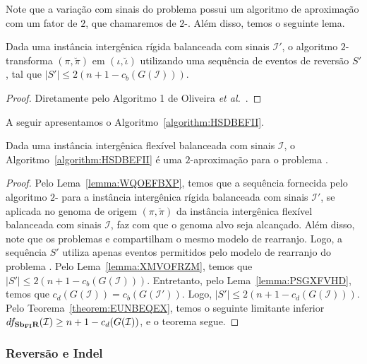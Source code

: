 Note que a variação com sinais do problema \SbIR{} possui um algoritmo de aproximação com um fator de $2$, que chamaremos de $2$-\SbIR{}. Além disso, temos o seguinte lema.

\begin{lemma}\label{lemma:XMVOFRZM}
Dada uma instância intergênica rígida balanceada com sinais $\mathcal{I}'$, o algoritmo $2$-\SbIR{} transforma $(\pi,\breve\pi)$ em $(\iota,\breve\iota)$ utilizando uma sequência de eventos de reversão $S'$, tal que $|S'| \le 2({n+1} - c_b(G(\mathcal{I})))$.
\end{lemma}
\begin{proof}
Diretamente pelo Algoritmo 1 de Oliveira \textit{et al.}~\cite{2021b-oliveira-etal}.
\end{proof}

A seguir apresentamos o Algoritmo~\ref{algorithm:HSDBEFII}.



\begin{theorem}\label{theorem:GTWKCOJR}
Dada uma instância intergênica flexível balanceada com sinais $\mathcal{I}$, o Algoritmo~\ref{algorithm:HSDBEFII} é uma $2$-aproximação para o problema \SbFIR{}.
\end{theorem}
\begin{proof}
Pelo Lema~\ref{lemma:WQOEFBXP}, temos que a sequência fornecida pelo algoritmo $2$-\SbIR{} para a instância intergênica rígida balanceada com sinais $\mathcal{I'}$, se aplicada no genoma de origem $(\pi,\breve\pi)$ da instância intergênica flexível balanceada com sinais $\mathcal{I}$, faz com que o genoma alvo seja alcançado. Além disso, note que os problemas \SbIR{} e \SbFIR{} compartilham o mesmo modelo de rearranjo. Logo, a sequência $S'$ utiliza apenas eventos permitidos pelo modelo de rearranjo do problema \SbFIR{}. Pelo Lema~\ref{lemma:XMVOFRZM}, temos que $|S'| \le 2({n+1} - c_b(G(\mathcal{I})))$. Entretanto, pelo Lema~\ref{lemma:PSGXFVHD}, temos que $c_d(G(\mathcal{I})) = c_b(G(\mathcal{I}'))$. Logo, $|S'| \le 2({n+1} - c_d(G(\mathcal{I})))$. Pelo Teorema~\ref{theorem:EUNBEQEX}, temos o seguinte limitante inferior $df_{\textbf{Sb\textsubscript{FI}R}}(\mathcal{I}) \ge {n+1} - c_d(G(\mathcal{I}))$, e o teorema segue.
\end{proof}

\subsubsection{Reversão e Indel}

